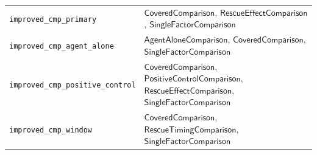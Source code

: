 \documentclass[10pt,a4paper]{article}
\begin{document}
\begin{tabularx}{\linewidth}{@{}>{\raggedright\arraybackslash}p{4.2cm}>{\raggedright\arraybackslash}X@{}}
\texttt{improved\_\allowbreak{}cmp\_\allowbreak{}primary} & $\mathsf{CoveredComparison}$, $\mathsf{RescueEffectComparison}$, $\mathsf{SingleFactorComparison}$ \\
\texttt{improved\_\allowbreak{}cmp\_\allowbreak{}agent\_\allowbreak{}alone} & $\mathsf{AgentAloneComparison}$, $\mathsf{CoveredComparison}$, $\mathsf{SingleFactorComparison}$ \\
\texttt{improved\_\allowbreak{}cmp\_\allowbreak{}positive\_\allowbreak{}control} & $\mathsf{CoveredComparison}$, $\mathsf{PositiveControlComparison}$, $\mathsf{RescueEffectComparison}$, $\mathsf{SingleFactorComparison}$ \\
\texttt{improved\_\allowbreak{}cmp\_\allowbreak{}window} & $\mathsf{CoveredComparison}$, $\mathsf{RescueTimingComparison}$, $\mathsf{SingleFactorComparison}$ \\
\bottomrule\end{tabularx}
\end{document}
